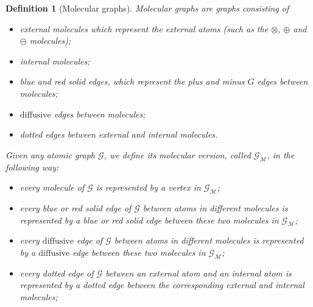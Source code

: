 \documentclass{article}
\newcommand{\1}{\mathds{1}}
\numberwithin{equation}{section}
\renewcommand{\cal}{\mathcal}
\newcommand{\dashed}{\text{diffusive}}
\theoremstyle{plain} %
\newtheorem{definition}[theorem]{Definition}
\theoremstyle{remark}
\newcommand{\cob}{\color{purple}}
\newcommand{\nc}{\normalcolor}
\begin{document}
\begin{definition}[Molecular graphs] \label{def moleg}%
 Molecular graphs are graphs consisting of 
	\begin{itemize}
		\item external molecules which represent the external atoms (such as the $\otimes$, $\oplus$ and $\ominus$ molecules);
		\item internal molecules;
		\item blue and red solid edges, which represent the plus and minus $G$ edges between molecules;
		\item $\dashed$ edges between molecules;
		\item dotted edges between external and internal molecules.
	\end{itemize}
	Given any atomic graph $\cal G$, we define its molecular version, called $ \cal G_{\cal M}$, in the following way:
	\begin{itemize}
		\item every molecule of $\cal G$ is represented by a vertex in $ \cal G_{\cal M}$;
		
		\item every blue or red solid edge of $\cal G$ between atoms in different molecules is represented by a blue or red solid edge between these two molecules in $ \cal G_{\cal M}$;
		

		
		\item every $\dashed$ edge of $\cal G$ between atoms in different molecules is represented by a $\dashed$ edge between these two molecules in $ \cal G_{\cal M}$;
		
		\item every dotted edge of $\cal G$ between an external atom and an internal atom is represented by a dotted edge between the corresponding external and internal molecules;
		
		

\end{itemize}
\end{definition}
\end{document}

